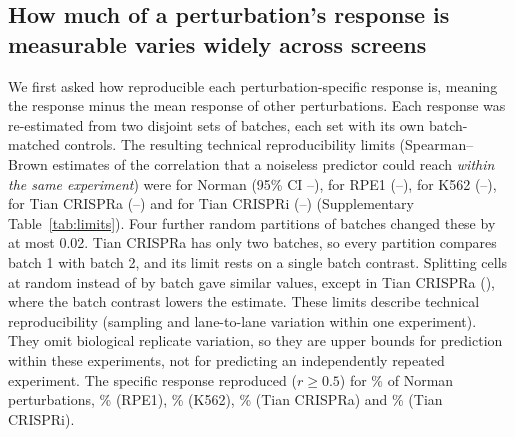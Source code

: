 \subsection{How much of a perturbation's response is measurable varies widely across screens}
We first asked how reproducible each perturbation-specific response is, meaning the response minus the mean response of other perturbations. Each response was re-estimated from two disjoint sets of batches, each set with its own batch-matched controls. The resulting technical reproducibility limits (Spearman--Brown estimates of the correlation that a noiseless predictor could reach \emph{within the same experiment}) were \numLimNorman{} for Norman (95\% CI \numLimLoNorman--\numLimHiNorman), \numLimReplogleRpe{} for RPE1 (\numLimLoReplogleRpe--\numLimHiReplogleRpe), \numLimReplogleKEssential{} for K562 (\numLimLoReplogleKEssential--\numLimHiReplogleKEssential), \numLimTianCrispra{} for Tian CRISPRa (\numLimLoTianCrispra--\numLimHiTianCrispra) and \numLimTianCrispri{} for Tian CRISPRi (\numLimLoTianCrispri--\numLimHiTianCrispri) (Supplementary Table~\ref{tab:limits}). Four further random partitions of batches changed these by at most 0.02. Tian CRISPRa has only two batches, so every partition compares batch 1 with batch 2, and its limit rests on a single batch contrast. Splitting cells at random instead of by batch gave similar values, except in Tian CRISPRa (\numLimCellsTianCrispra), where the batch contrast lowers the estimate. These limits describe technical reproducibility (sampling and lane-to-lane variation within one experiment). They omit biological replicate variation, so they are upper bounds for prediction within these experiments, not for predicting an independently repeated experiment. The specific response reproduced ($r\ge0.5$) for \numFracReproNorman\% of Norman perturbations, \numFracReproReplogleRpe\% (RPE1), \numFracReproReplogleKEssential\% (K562), \numFracReproTianCrispra\% (Tian CRISPRa) and \numFracReproTianCrispri\% (Tian CRISPRi).

